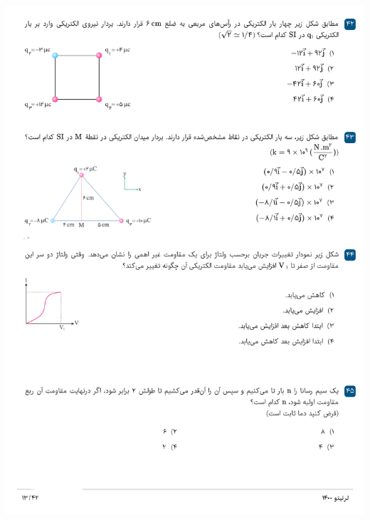 \documentclass{book}
\begin{document}
\includegraphics[width=\textwidth]{"pages/13"}
\end{document}
